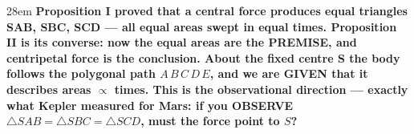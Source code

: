 \documentclass[border=4pt]{standalone}
\begin{document}
\begin{varwidth}{28em}
\large\bfseries
Proposition I proved that a central force produces equal triangles SAB, SBC, SCD — all equal areas swept in equal times. Proposition II is its converse: now the equal areas are the PREMISE, and centripetal force is the conclusion. About the fixed centre S the body follows the polygonal path $A\,B\,C\,D\,E$, and we are GIVEN that it describes areas $\propto$ times. This is the observational direction — exactly what Kepler measured for Mars: if you OBSERVE $\triangle SAB=\triangle SBC=\triangle SCD$, must the force point to $S$?
\end{varwidth}
\end{document}
